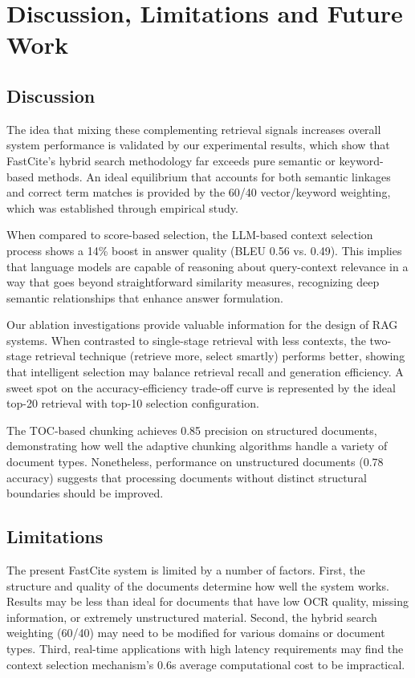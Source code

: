 \documentclass[runningheads]{llncs}
\begin{document}
%
%
\section{Discussion, Limitations and Future Work}

\subsection{Discussion}

The idea that mixing these complementing retrieval signals increases overall system performance is validated by our experimental results, which show that FastCite's hybrid search methodology far exceeds pure semantic or keyword-based methods. An ideal equilibrium that accounts for both semantic linkages and correct term matches is provided by the 60/40 vector/keyword weighting, which was established through empirical study.

When compared to score-based selection, the LLM-based context selection process shows a 14\% boost in answer quality (BLEU 0.56 vs. 0.49). This implies that language models are capable of reasoning about query-context relevance in a way that goes beyond straightforward similarity measures, recognizing deep semantic relationships that enhance answer formulation.

Our ablation investigations provide valuable information for the design of RAG systems. When contrasted to single-stage retrieval with less contexts, the two-stage retrieval technique (retrieve more, select smartly) performs better, showing that intelligent selection may balance retrieval recall and generation efficiency. A sweet spot on the accuracy-efficiency trade-off curve is represented by the ideal top-20 retrieval with top-10 selection configuration.

The TOC-based chunking achieves 0.85 precision on structured documents, demonstrating how well the adaptive chunking algorithms handle a variety of document types. Nonetheless, performance on unstructured documents (0.78 accuracy) suggests that processing documents without distinct structural boundaries should be improved.

\subsection{Limitations}

The present FastCite system is limited by a number of factors. First, the structure and quality of the documents determine how well the system works. Results may be less than ideal for documents that have low OCR quality, missing information, or extremely unstructured material. Second, the hybrid search weighting (60/40) may need to be modified for various domains or document types. Third, real-time applications with high latency requirements may find the context selection mechanism's 0.6s average computational cost to be impractical.
\end{document}
